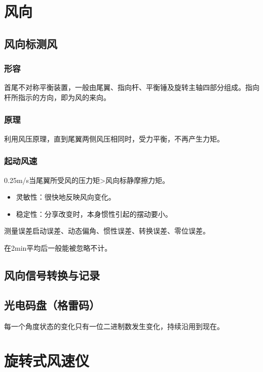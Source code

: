\documentclass[UTF8,11pt]{ctexbook}
\begin{document}
\section{风向}


\subsection{风向标测风}

\subsubsection{形容}

首尾不对称平衡装置，一般由尾翼、指向杆、平衡锤及旋转主轴四部分组成。指向杆所指示的方向，即为风的来向。

\subsubsection{原理}

利用风压原理，直到尾翼两侧风压相同时，受力平衡，不再产生力矩。

\subsubsection{起动风速}

0.25m/s当尾翼所受风的压力矩>风向标静摩擦力矩。
\begin{itemize}
    \item 灵敏性：很快地反映风向变化。
    \item 稳定性：分享改变时，本身惯性引起的摆动要小。
\end{itemize}

测量误差启动误差、动态偏角、惯性误差、转换误差、零位误差。

在2min平均后一般能被忽略不计。

\subsection{风向信号转换与记录}

\subsection{光电码盘（格雷码）}

每一个角度状态的变化只有一位二进制数发生变化，持续沿用到现在。

\section{旋转式风速仪}
\end{document}
